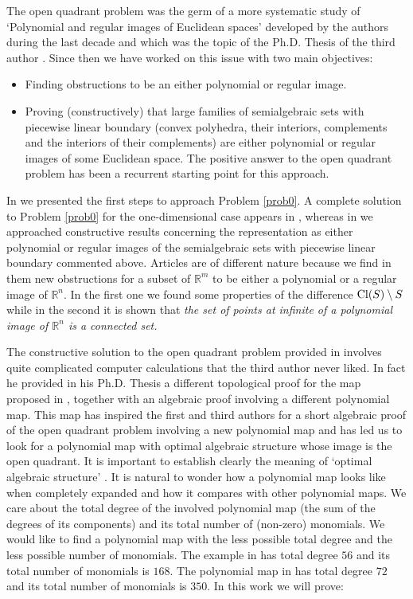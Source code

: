 \documentclass[10pt,twoside]{homg3} %
\renewcommand{\R}{\mathbb{R}}
\begin{document}
The open quadrant problem was the germ of a more systematic study of `Polynomial and regular images of Euclidean spaces' developed by the authors during the last decade and which was the topic of the Ph.D. Thesis of the third author \cite{u0}. Since then we have worked on this issue with two main objectives: 
\begin{itemize}
\item Finding obstructions to be an either polynomial or regular image. 
\item Proving (constructively) that large families of semialgebraic sets with piecewise linear boundary (convex polyhedra, their interiors, complements and the interiors of their complements) are either polynomial or regular images of some Euclidean space. The positive answer to the open quadrant problem has been a recurrent starting point for this approach.
\end{itemize}

In \cite{fg1,fg2} we presented the first steps to approach Problem \ref{prob0}. A complete solution to Problem \ref{prob0} for the one-dimensional case appears in \cite{fe2}, whereas in \cite{fgu1,fu1,fu2,u1,u2} we approached constructive results concerning the representation as either polynomial or regular images of the semialgebraic sets with piecewise linear boundary commented above. Articles \cite{fgu2,fu3} are of different nature because we find in them new obstructions for a subset of $\R^m$ to be either a polynomial or a regular image of $\R^n$. In the first one we found some properties of the difference ${\rm Cl}(S)\setminus S$ while in the second it is shown that \em the set of points at infinite of a polynomial image of $\R^n$ is a connected set\em.

The constructive solution to the open quadrant problem provided in \cite{fg1} involves quite complicated computer calculations that the third author never liked. In fact he provided in his Ph.D. Thesis a different topological proof for the map proposed in \cite{fg1}, together with an algebraic proof involving a different polynomial map. This map has inspired the first and third authors for a short algebraic proof of the open quadrant problem involving a new polynomial map \cite{fu4} and has led us to look for a polynomial map with optimal algebraic structure whose image is the open quadrant. It is important to establish clearly the meaning of `optimal algebraic structure' \cite[\S3(A)]{fu4}. It is natural to wonder how a polynomial map looks like when completely expanded and how it compares with other polynomial maps. We care about the total degree of the involved polynomial map (the sum of the degrees of its components) and its total number of (non-zero) monomials. We would like to find a polynomial map with the less possible total degree and the less possible number of monomials. The example in \cite{fg1} has total degree $56$ and its total number of monomials is $168$. The polynomial map in \cite{fu4} has total degree $72$ and its total number of monomials is $350$. In this work we will prove:
\end{document}
